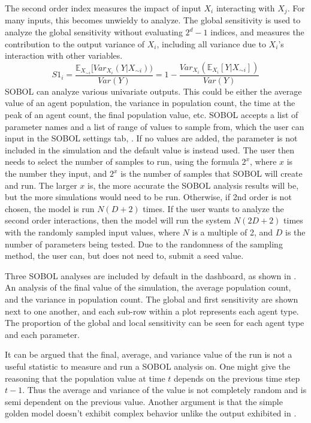 The second order index measures the impact of input $X_i$ interacting with $X_j$. For many inputs, this becomes unwieldy to analyze.
The global sensitivity is used to analyze the global sensitivity without evaluating $2^d-1$ indices, and measures the contribution to the output variance of $X_i$, including all variance due to $X_i$'s interaction with other variables.
\[
    S1_i = \frac{\mathbb{E}_{X_{\sim i}}[\textit{Var}_{X_i}(Y|X_{\sim i}))}{\textit{Var}(Y)} = 1 - \frac{\textit{Var}_{X_i}(\mathbb{E}_{X_i}[Y|X_{\sim i}])}{\textit{Var}(Y)}
\]
SOBOL can analyze various univariate outputs.
This could be either the average value of an agent population, the variance in population count, the time at the peak of an agent count, the final population value, etc. \newline
SOBOL accepts a list of parameter names and a list of range of values to sample from, which the user can input in the SOBOL settings tab, . 
If no values are added, the parameter is not included in the simulation and the default value is instead used. 
The user then needs to select the number of samples to run, using the formula $2^x$, where $x$ is the number they input, and $2^x$ is the number of samples that SOBOL will create and run.
The larger $x$ is, the more accurate the SOBOL analysis results will be, but the more simulations would need to be run. \newline
Otherwise, if 2nd order is not chosen, the model is run $N(D+2)$ times.
If the user wants to analyze the second order interactions, then the model will run the system $N(2D+2)$ times with the randomly sampled input values, where $N$ is a multiple of 2, and $D$ is the number of parameters being tested.
Due to the randomness of the sampling method, the user can, but does not need to, submit a seed value. 

Three SOBOL analyses are included by default in the dashboard, as shown in .
An analysis of the final value of the simulation, the average population count, and the variance in population count.
The global and first sensitivity are shown next to one another, and each sub-row within a plot represents each agent type. 
The proportion of the global and local sensitivity can be seen for each agent type and each parameter.

It can be argued that the final, average, and variance value of the run is not a useful statistic to measure and run a SOBOL analysis on. 
One might give the reasoning that the population value at time $t$ depends on the previous time step $t-1$. 
Thus the average and variance of the value is not completely random and is semi dependent on the previous value. 
Another argument is that the simple golden model doesn't exhibit complex behavior unlike the output exhibited in . 

